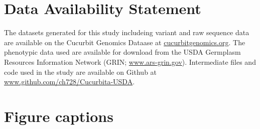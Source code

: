 \documentclass[utf8]{FrontiersinHarvard} %
\begin{document}
\section*{Data Availability Statement}
The datasets generated for this study includeing variant and raw sequence data are available on the Cucurbit Genomics Dataase at \href{https://cucurbitgenomics.org}{cucurbitgenomics.org}. The phenotypic data used are available for download from the USDA Germplasm Resources Information Network (GRIN; \href{https://www.ars-grin.gov}{www.ars-grin.gov}). Intermediate files and code used in the study are available on Github at \href{https://www.github.com/ch728/Cucurbita-USDA}{www.github.com/ch728/Cucurbita-USDA}.


\clearpage 




\clearpage

\section*{Figure captions}

\end{document}
